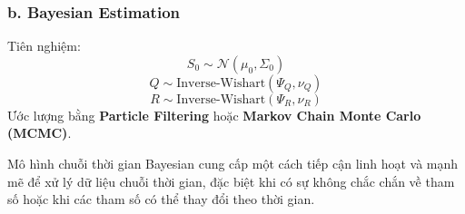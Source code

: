 \subsubsection{b. Bayesian Estimation}
Tiên nghiệm:
\begin{equation}
    S_0 \sim \mathcal{N}(\mu_0, \Sigma_0)
\end{equation}
\begin{equation}
    Q \sim \text{Inverse-Wishart}(\Psi_Q, \nu_Q)
\end{equation}
\begin{equation}
    R \sim \text{Inverse-Wishart}(\Psi_R, \nu_R)
\end{equation}
Ước lượng bằng \textbf{Particle Filtering} hoặc \textbf{Markov Chain Monte Carlo (MCMC)}.




Mô hình chuỗi thời gian Bayesian cung cấp một cách tiếp cận linh hoạt và mạnh mẽ để xử lý dữ liệu chuỗi thời gian, đặc biệt khi có sự không chắc chắn về tham số hoặc khi các tham số có thể thay đổi theo thời gian.
